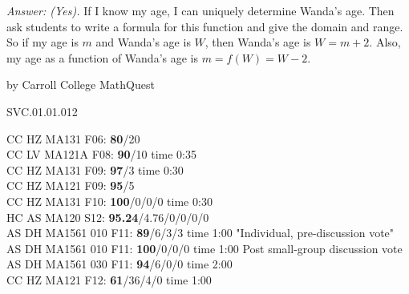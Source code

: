 {\it Answer: (Yes).} If I know my age, I can uniquely determine Wanda's age. Then ask students to write a formula for this function and give the domain and range. So if my age is $m$ and Wanda's age is $W$, then Wanda's age is $W = m + 2$. Also, my age as a function of Wanda's age is $m = f (W) = W - 2$. 


\medskip




by Carroll College MathQuest

SVC.01.01.012


CC HZ MA131 F06: {\bf 80}/20\\
CC LV MA121A F08: {\bf 90}/10 time 0:35 \\
CC HZ MA131 F09: {\bf 97}/3 time 0:30  \\
CC HZ MA121 F09: {\bf 95}/5  \\
CC HZ MA131 F10: {\bf 100}/0/0/0 time 0:30  \\
HC AS MA120 S12: {\bf 95.24}/4.76/0/0/0/0  \\
AS DH MA1561 010 F11: {\bf 89}/6/3/3 time 1:00 "Individual, pre-discussion vote" \\
AS DH MA1561 010 F11: {\bf 100}/0/0/0 time 1:00 Post small-group discussion vote \\
AS DH MA1561 030 F11: {\bf 94}/6/0/0 time 2:00  \\
CC HZ MA121 F12: {\bf 61}/36/4/0 time 1:00  \\
